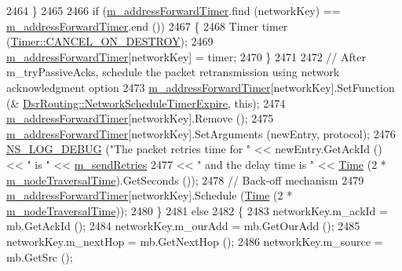 \begin{DoxyCode}
2464         \}
2465 
2466       \textcolor{keywordflow}{if} (\hyperlink{classns3_1_1dsr_1_1DsrRouting_a4a35b13cdca413ab5bc0b1b3b7b78907}{m\_addressForwardTimer}.find (networkKey) == 
      \hyperlink{classns3_1_1dsr_1_1DsrRouting_a4a35b13cdca413ab5bc0b1b3b7b78907}{m\_addressForwardTimer}.end ())
2467         \{
2468           Timer timer (\hyperlink{classns3_1_1Timer_a816309b83cd2a35bea47d9bbc6bbf721a07a9dd5063b32fb6cf1f813c6ee7e28e}{Timer::CANCEL\_ON\_DESTROY});
2469           \hyperlink{classns3_1_1dsr_1_1DsrRouting_a4a35b13cdca413ab5bc0b1b3b7b78907}{m\_addressForwardTimer}[networkKey] = timer;
2470         \}
2471 
2472       \textcolor{comment}{// After m\_tryPassiveAcks, schedule the packet retransmission using network acknowledgment option}
2473       \hyperlink{classns3_1_1dsr_1_1DsrRouting_a4a35b13cdca413ab5bc0b1b3b7b78907}{m\_addressForwardTimer}[networkKey].SetFunction (&
      \hyperlink{classns3_1_1dsr_1_1DsrRouting_aabcdf59bcb4907718986626a7a402dad}{DsrRouting::NetworkScheduleTimerExpire}, \textcolor{keyword}{this});
2474       \hyperlink{classns3_1_1dsr_1_1DsrRouting_a4a35b13cdca413ab5bc0b1b3b7b78907}{m\_addressForwardTimer}[networkKey].Remove ();
2475       \hyperlink{classns3_1_1dsr_1_1DsrRouting_a4a35b13cdca413ab5bc0b1b3b7b78907}{m\_addressForwardTimer}[networkKey].SetArguments (newEntry, protocol);
2476       \hyperlink{group__logging_ga413f1886406d49f59a6a0a89b77b4d0a}{NS\_LOG\_DEBUG} (\textcolor{stringliteral}{"The packet retries time for "} << newEntry.GetAckId () << \textcolor{stringliteral}{" is "} << 
      \hyperlink{classns3_1_1dsr_1_1DsrRouting_a02a55fe3b490af4dbd62953065d293a3}{m\_sendRetries}
2477                                                    << \textcolor{stringliteral}{" and the delay time is "} << 
      \hyperlink{namespacens3_1_1TracedValueCallback_a7ffd3e7c142ffe7c8a1d2db9b8de38ec}{Time} (2 * \hyperlink{classns3_1_1dsr_1_1DsrRouting_a4c406057009653878e8cdf3e3a7f2106}{m\_nodeTraversalTime}).GetSeconds ());
2478       \textcolor{comment}{// Back-off mechanism}
2479       \hyperlink{classns3_1_1dsr_1_1DsrRouting_a4a35b13cdca413ab5bc0b1b3b7b78907}{m\_addressForwardTimer}[networkKey].Schedule (\hyperlink{namespacens3_1_1TracedValueCallback_a7ffd3e7c142ffe7c8a1d2db9b8de38ec}{Time} (2 * 
      \hyperlink{classns3_1_1dsr_1_1DsrRouting_a4c406057009653878e8cdf3e3a7f2106}{m\_nodeTraversalTime}));
2480     \}
2481   \textcolor{keywordflow}{else}
2482     \{
2483       networkKey.m\_ackId = mb.GetAckId ();
2484       networkKey.m\_ourAdd = mb.GetOurAdd ();
2485       networkKey.m\_nextHop = mb.GetNextHop ();
2486       networkKey.m\_source = mb.GetSrc ();

\end{DoxyCode}
